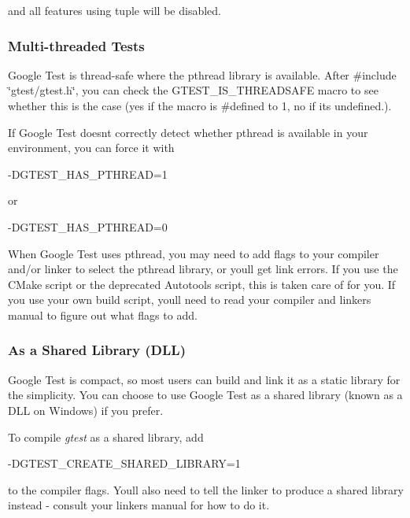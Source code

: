and all features using tuple will be disabled.

\subsubsection*{Multi-\/threaded Tests}

Google Test is thread-\/safe where the pthread library is available. After {\ttfamily \#include \char`\"{}gtest/gtest.\+h\char`\"{}}, you can check the {\ttfamily G\+T\+E\+S\+T\+\_\+\+I\+S\+\_\+\+T\+H\+R\+E\+A\+D\+S\+A\+FE} macro to see whether this is the case (yes if the macro is {\ttfamily \#defined} to 1, no if it\textquotesingle{}s undefined.).

If Google Test doesn\textquotesingle{}t correctly detect whether pthread is available in your environment, you can force it with \begin{DoxyVerb}-DGTEST_HAS_PTHREAD=1
\end{DoxyVerb}


or \begin{DoxyVerb}-DGTEST_HAS_PTHREAD=0
\end{DoxyVerb}


When Google Test uses pthread, you may need to add flags to your compiler and/or linker to select the pthread library, or you\textquotesingle{}ll get link errors. If you use the C\+Make script or the deprecated Autotools script, this is taken care of for you. If you use your own build script, you\textquotesingle{}ll need to read your compiler and linker\textquotesingle{}s manual to figure out what flags to add.

\subsubsection*{As a Shared Library (D\+LL)}

Google Test is compact, so most users can build and link it as a static library for the simplicity. You can choose to use Google Test as a shared library (known as a D\+LL on Windows) if you prefer.

To compile {\itshape gtest} as a shared library, add \begin{DoxyVerb}-DGTEST_CREATE_SHARED_LIBRARY=1
\end{DoxyVerb}


to the compiler flags. You\textquotesingle{}ll also need to tell the linker to produce a shared library instead -\/ consult your linker\textquotesingle{}s manual for how to do it.

